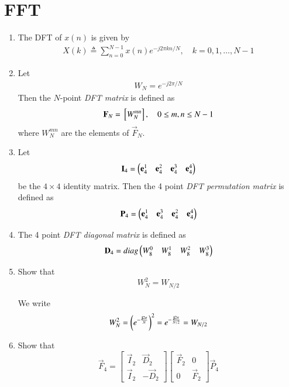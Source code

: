 \documentclass[journal,12pt,twocolumn]{IEEEtran}
\renewcommand\thesection{\arabic{section}}
\begin{document}
\section{FFT}
\begin{enumerate}[label=\thesection.\arabic*.,ref=\thesection.\theenumi]
    \item The DFT of $x(n)$ is given by
    \begin{align}
        X(k) \triangleq \sum_{n=0}^{N-1} x(n) e^{-j 2 \pi k n / N}, \quad k=0,1, \ldots, N-1
    \end{align}
\item Let 
	\begin{align}
W_{N} = e^{-j2\pi/N} 
	\end{align}
		Then the $N$-point {\em DFT matrix} is defined as 
	\begin{align}
		\mathbf{F}_{N} = {}\left[W_{N}^{mn}\right], \quad 0 \le m,n \le N-1 
	\end{align}
	where $W_{N}^{mn}$ are the elements of $\vec{F}_{N}$.
\item Let 
	\begin{align}
		\mathbf{I}_4 = \begin{pmatrix}\mathbf{e}_4^{1} &\mathbf{e}_4^{2} &\mathbf{e}_4^{3} &\mathbf{e}_4^{4} \end{pmatrix}
	\end{align}
		be the $4\times 4$ identity matrix.  Then the 4 point {\em DFT permutation matrix} is defined as 
	\begin{align}
		\mathbf{P}_4 = \begin{pmatrix}\mathbf{e}_4^{1} &\mathbf{e}_4^{3} &\mathbf{e}_4^{2} &\mathbf{e}_4^{4} \end{pmatrix}
	\end{align}
\item The 4 point {\em DFT diagonal matrix} is defined as 
	\begin{align}
		\mathbf{D}_4 = diag\begin{pmatrix}W_{8}^{0} & W_{8}^{1} & W_{8}^{2} & W_{8}^{3}\end{pmatrix}
	\end{align}
\item Show that 
\begin{equation}
    W_{N}^{2}=W_{N/2}
	\label{eq:n-2}
\end{equation}

\solution We write
\begin{align}
	W_N^2 = \left(e^{-\frac{\mathbf{j}2\pi}{N}}\right)^2 = e^{-\frac{\mathbf{j}2\pi}{N/2}} = W_{N/2}
\end{align}
\item Show that 
\begin{equation}
	\vec{F}_{4}=
\begin{bmatrix}
	\vec{I}_{2} & \vec{D}_{2} \\
\vec{I}_{2} & -\vec{D}_{2}
\end{bmatrix}
\begin{bmatrix}
\vec{F}_{2} & 0 \\
0 & \vec{F}_{2}
\end{bmatrix}
\vec{P}_{4}
\label{eq:fft-recurrence}
\end{equation}


\end{enumerate}
\end{document}

